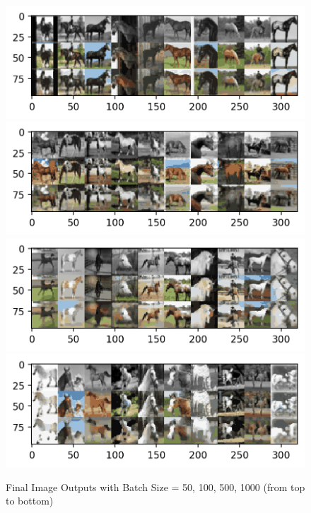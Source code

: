 \documentclass[12pt]{article}
\begin{document}
	\begin{figure}[H]
		\centering
		\caption{Final Image Outputs with Batch Size = 50, 100, 500, 1000 (from top to bottom)}
		\includegraphics[width=\linewidth]{figures/unet_output_bs_50.png}
		\includegraphics[width=\linewidth]{figures/unet_output_bs_100.png}
		\includegraphics[width=\linewidth]{figures/unet_output_bs_500.png}
		\includegraphics[width=\linewidth]{figures/unet_output_bs_1000.png}
	\end{figure}
\end{document}

